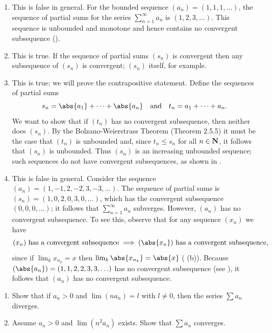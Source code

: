 \documentclass{lew98_solutions}
\begin{document}
\begin{solution}
    \begin{enumerate}
        \item This is false in general. For the bounded sequence \( (a_n) = (1, 1, 1, \ldots) \), the sequence of partial sums for the series \( \sum_{n=1}^{\infty} a_n \) is \( (1, 2, 3, \ldots) \). This sequence is unbounded and monotone and hence contains no convergent subsequence ().

        \item This is true. If the sequence of partial sums \( (s_n) \) is convergent then any subsequence of \( (s_n) \) is convergent; \( (s_n) \) itself, for example.

        \item This is true; we will prove the contrapositive statement. Define the sequences of partial sums
        \[
            s_n = \abs{a_1} + \cdots + \abs{a_n} \quad \text{and} \quad t_n = a_1 + \cdots + a_n.
        \]
        We want to show that if \( (t_n) \) has no convergent subsequence, then neither does \( (s_n) \). By the Bolzano-Weierstrass Theorem (Theorem 2.5.5) it must be the case that \( (t_n) \) is unbounded and, since \( t_n \leq s_n \) for all \( n \in \mathbf{N} \), it follows that \( (s_n) \) is unbounded. Thus \( (s_n) \) is an increasing unbounded sequence; such sequences do not have convergent subsequences, as shown in .

        \item This is false in general. Consider the sequence \( (a_n) = (1, -1, 2, -2, 3, -3, \ldots) \). The sequence of partial sums is \( (s_n) = (1, 0, 2, 0, 3, 0, \ldots) \), which has the convergent subsequence \( (0, 0, 0, \ldots) \); it follows that \( \sum_{n=1}^{\infty} a_n \) subverges. However, \( (a_n) \) has no convergent subsequence. To see this, observe that for any sequence \( (x_n) \) we have
        \[
            (x_n) \text{ has a convergent subsequence} \implies (\abs{x_n}) \text{ has a convergent subsequence},
        \]
        since if \( \lim_k x_{n_k} = x \) then \( \lim_k \abs{x_{n_k}} = \abs{x} \) ( (b)). Because \( (\abs{a_n}) = (1, 1, 2, 2, 3, 3, \ldots) \) has no convergent subsequence (see ), it follows that \( (a_n) \) has no convergent subsequence.
    \end{enumerate}
\end{solution}

\begin{exercise}
\label{ex:2.7.7}
    \begin{enumerate}
        \item Show that if \( a_n > 0 \) and \( \lim (n a_n) = l \) with \( l \neq 0 \), then the series \( \sum a_n \) diverges.

        \item Assume \( a_n > 0 \) and \( \lim (n^2 a_n) \) exists. Show that \( \sum a_n \) converges.
    \end{enumerate}
\end{exercise}
\end{document}
